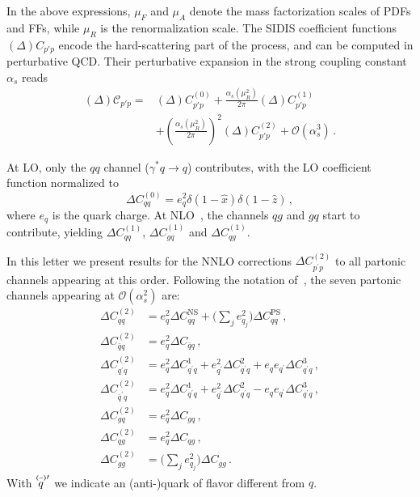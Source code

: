 \documentclass[10pt,aps,prl,twocolumn,preprintnumbers,nofootinbib]{revtex4-2}
\newcommand{\Ccal}{\mathcal{C}}
\newcommand{\DC}{\Delta C}
\newcommand{\hx}{\hat{x}}
\newcommand{\hz}{\hat{z}}
\newcommand{\qb}{\bar{q}}
\newcommand{\qp}{q^{\prime}}
\newcommand{\qbp}{\bar{q}^{\prime}}
\begin{document}
In the above expressions, $\mu_F$  and $\mu_A$
denote the mass factorization scales of PDFs and FFs, 
while $\mu_R$ is the renormalization scale. 
 The SIDIS coefficient
functions $(\Delta)C_{p'p}$ encode the hard-scattering part of the process, and can be computed in
perturbative QCD. Their perturbative expansion in the strong coupling constant
$\alpha_s$ reads
\begin{align}
  (\Delta) \Ccal_{p' p} =& (\Delta)C^{(0)}_{p' p}
  + \frac{\alpha_s(\mu_R^2)}{2\pi}  (\Delta)C^{(1)}_{p' p}
  \nonumber \\ 
  &+ \left(\frac{\alpha_s(\mu_R^2)}{2\pi}\right)^2   (\Delta)C^{(2)}_{p' p}
  + \mathcal{O}(\alpha_s^3)\, .
\end{align} 

At LO, only the $qq$ channel ($\gamma^* q\to q$) contributes, with the LO
coefficient function normalized to
\begin{equation}
  \DC^{(0)}_{qq}= e_q^2 \delta(1-\hx) \delta(1-\hz)\, ,
\end{equation}
where $e_q$ is the quark charge. 
At NLO~\cite{deFlorian:1997zj}, the channels $qg$ and
$gq$ start to contribute, yielding $\DC^{(1)}_{qq}$, $\DC^{(1)}_{gq}$ and $\DC^{(1)}_{qg}$.

In this letter we present results for the NNLO corrections
$\DC^{(2)}_{p^{\prime}p}$ to all partonic channels appearing at this order.
Following the notation of~\cite{Anderle:2016kwa,Bonino:2024qbh}, the seven partonic channels
appearing at $\mathcal{O}(\alpha_s^2)$ are:
{ \allowdisplaybreaks
\begin{align}\label{CFNNLOlist}
\DC^{(2)}_{qq}&=e_q^2 \DC^{\mathrm{NS}}_{qq}+\biggl( \sum_j e^2_{q_j}\biggr)\DC^{\mathrm{PS}}_{qq} \, , \nonumber \\
\DC^{(2)}_{\qb q}&=e_q^2\DC_{\qb q} \, , \nonumber \\
\DC^{(2)}_{\qp q}&=e_q^2 \DC^{1}_{\qp q}+e_{\qp}^2 \DC^{2}_{\qp q}+e_q e_{\qp}\DC^{3}_{\qp q} \, , \nonumber \\
\DC^{(2)}_{\qbp q}&=e_q^2 \DC^{1}_{\qp q}+e_{\qp}^2 \DC^{2}_{\qp q}-e_q e_{\qp} \DC^{3}_{\qp q} \, , \nonumber \\
\DC^{(2)}_{gq}&=e_q^2 \DC_{gq} \, , \nonumber \\
\DC^{(2)}_{qg}&=e_q^2 \DC_{qg} \, , \nonumber \\
\DC^{(2)}_{gg}&=\biggl( \sum_j e_{q_j}^2 \biggr) \DC_{gg} \,  .
\end{align}
}
With $\overset{\textbf{\fontsize{5pt}{5pt}\selectfont(--)}\prime}{q\phantom{.}}$ we indicate an (anti-)quark of flavor different from $q$.
\end{document}
